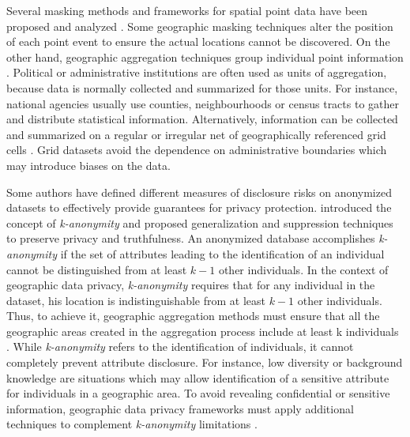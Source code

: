 Several masking methods and frameworks for spatial point data have been proposed and analyzed \citep{Cox1996, Armstrong2005, Zimmerman2007}. Some geographic masking techniques alter the position of each point event to ensure the actual locations cannot be discovered. On the other hand, geographic aggregation techniques group individual point information \citep{Zimmerman2007}. Political or administrative institutions are often used as units of aggregation, because data is normally collected and summarized for those units. For instance, national agencies usually use counties, neighbourhoods or census tracts to gather and distribute statistical information. Alternatively, information can be collected and summarized on a regular or irregular net of geographically referenced grid cells \citep{Tammilehto2000, Tammilehto2011}. Grid datasets avoid the dependence on administrative boundaries which may introduce biases on the data.

Some authors have defined different measures of disclosure risks on anonymized datasets to effectively provide guarantees for privacy protection. \cite{Sweeney2002} introduced the concept of \emph{k-anonymity} and proposed generalization and suppression techniques to preserve privacy and truthfulness. An anonymized database accomplishes \emph{k-anonymity} if the set of attributes leading to the identification of an individual cannot be distinguished from at least $k-1$ other individuals. In the context of geographic data privacy, \emph{k-anonymity} requires that for any individual in the dataset, his location is indistinguishable from at least $k-1$ other individuals. Thus, to achieve it, geographic aggregation methods must ensure that all the geographic areas created in the aggregation process include at least k individuals \citep{Vu2012}. While \emph{k-anonymity} refers to the identification of individuals, it cannot completely prevent attribute disclosure. For instance, low diversity or background knowledge are situations which may allow identification of a sensitive attribute for individuals in a geographic area. To avoid revealing confidential or sensitive information, geographic data privacy frameworks must apply additional techniques to complement \emph{k-anonymity} limitations \citep{Machanavajjhala2007, Li2007}.

